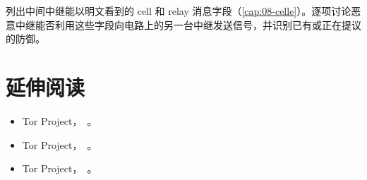 \begin{esercizio}[3]\label{es:27-canali}
列出中间中继能以明文看到的 cell 和 relay 消息字段（\cref{cap:08-celle}）。逐项讨论恶意中继能否利用这些字段向电路上的另一台中继发送信号，并识别已有或正在提议的防御。
\end{esercizio}

\section*{延伸阅读}
\begin{itemize}
  \item Tor Project，~\cite{torblog2014relayearly}。
  \item Tor Project，~\cite{torblog2022badrelays}。
  \item Tor Project，~\cite{torblog2023pow}。
\end{itemize}
